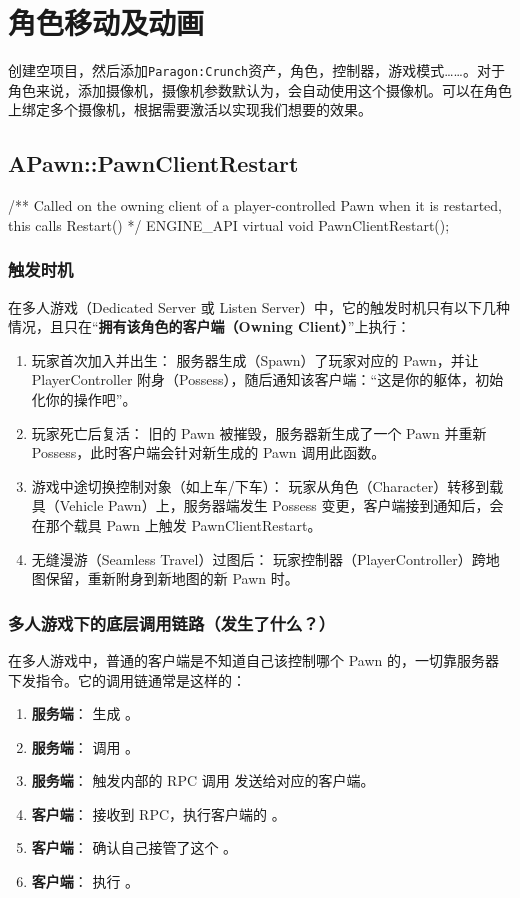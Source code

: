 
\chapter{角色移动及动画}
创建空\cppsign{}项目，然后添加\texttt{Paragon:Crunch}资产，角色，控制器，游戏模式……。对于角色来说，添加摄像机，摄像机参数默认为，会自动使用这个摄像机。可以在角色上绑定多个摄像机，根据需要激活以实现我们想要的效果。
\section{APawn::PawnClientRestart}
\begin{code}
	/** Called on the owning client of a player-controlled Pawn when it is restarted, this calls Restart() */
	ENGINE_API virtual void PawnClientRestart();
\end{code}
\subsection{触发时机}
在多人游戏（Dedicated Server 或 Listen Server）中，它的触发时机只有以下几种情况，且只在“\textbf{拥有该角色的客户端（Owning Client）}”上执行：
\begin{enumerate}
	\item 玩家首次加入并出生： 服务器生成（Spawn）了玩家对应的 Pawn，并让 PlayerController 附身（Possess），随后通知该客户端：“这是你的躯体，初始化你的操作吧”。
	\item 玩家死亡后复活： 旧的 Pawn 被摧毁，服务器新生成了一个 Pawn 并重新 Possess，此时客户端会针对新生成的 Pawn 调用此函数。
	\item 游戏中途切换控制对象（如上车/下车）： 玩家从角色（Character）转移到载具（Vehicle Pawn）上，服务器端发生 Possess 变更，客户端接到通知后，会在那个载具 Pawn 上触发 PawnClientRestart。
	\item 无缝漫游（Seamless Travel）过图后： 玩家控制器（PlayerController）跨地图保留，重新附身到新地图的新 Pawn 时。
\end{enumerate}

\subsection{多人游戏下的底层调用链路（发生了什么？）}
在多人游戏中，普通的客户端是不知道自己该控制哪个 Pawn 的，一切靠服务器下发指令。它的调用链通常是这样的：
\begin{enumerate}
	\item \textbf{服务端}： 生成 。
	\item \textbf{服务端}： 调用 。
	\item \textbf{服务端}：  触发内部的 RPC 调用  发送给对应的客户端。
	\item \textbf{客户端}： 接收到 RPC，执行客户端的 。
	\item \textbf{客户端}： 确认自己接管了这个 。
	\item \textbf{客户端}： 执行 。
\end{enumerate}

